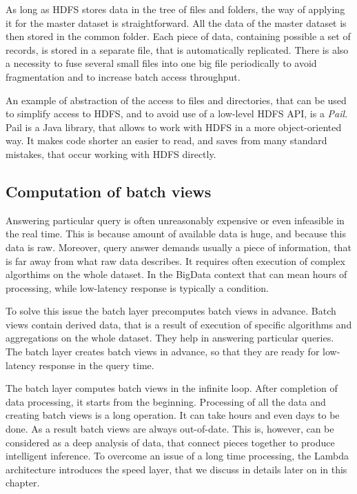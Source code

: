 As long as HDFS stores data in the tree of files and folders, the way of applying it for the master dataset is straightforward.
All the data of the master dataset is then stored in the common folder.
Each piece of data, containing possible a set of records, is stored in a separate file, that is automatically replicated.
There is also a necessity to fuse several small files into one big file periodically to avoid fragmentation and to increase batch access throughput.

An example of abstraction of the access to files and directories, that can be used to simplify access to HDFS, and to avoid use of a low-level HDFS API, is a \textit{Pail}.
Pail is a Java library, that allows to work with HDFS in a more object-oriented way.
It makes code shorter an easier to read, and saves from many standard mistakes, that occur working with HDFS directly.

\subsection{Computation of batch views}

Answering particular query is often unreasonably expensive or even infeasible in the real time.
This is because amount of available data is huge, and because this data is raw. 
Moreover, query answer demands usually a piece of information, that is far away from what raw data describes.
It requires often execution of complex algorthims on the whole dataset.
In the BigData context that can mean hours of processing, while low-latency response is typically a condition.

To solve this issue the batch layer precomputes batch views in advance.
Batch views contain derived data, that is a result of execution of specific algorithms and aggregations on the whole dataset.
They help in answering particular queries.
The batch layer creates batch views in advance, so that they are ready for low-latency response in the query time.

The batch layer computes batch views in the infinite loop.
After completion of data processing, it starts from the beginning.
Processing of all the data and creating batch views is a long operation.
It can take hours and even days to be done.
As a result batch views are always out-of-date.
This is, however, can be considered as a deep analysis of data, that connect pieces together to produce intelligent inference.
To overcome an issue of a long time processing, the Lambda architecture introduces the speed layer, that we discuss in details later on in this chapter.

